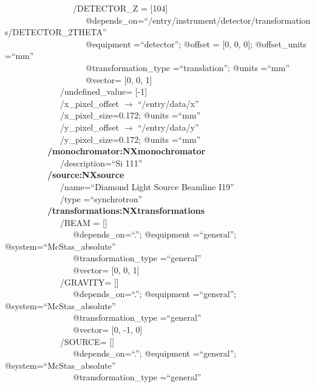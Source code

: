 \documentclass[11pt]{a0poster}
\begin{document}
\begin{minipage}[]{0.29\linewidth}
\-\ ~~~~~~~~~~~~~~~/DETECTOR\_Z = [104]\\
\-\ ~~~~~~~~~~~~~~~~~~@depends\_on=``/entry/instrument/detector/transformations/DETECTOR\_2THETA''\\
\-\ ~~~~~~~~~~~~~~~~~~@equipment =``detector''; @offset = [0, 0, 0]; @offset\_units =``mm''\\
\-\ ~~~~~~~~~~~~~~~~~~@transformation\_type =``translation''; @units =``mm''\\
\-\ ~~~~~~~~~~~~~~~~~~@vector= [0, 0, 1]\\
\-\ ~~~~~~~~~~~~/undefined\_value= [-1]\\
\-\ ~~~~~~~~~~~~/x\_pixel\_offset $\rightarrow$  ``/entry/data/x''\\
\-\ ~~~~~~~~~~~~/x\_pixel\_size=0.172; @units =``mm''\\
\-\ ~~~~~~~~~~~~/y\_pixel\_offset $\rightarrow$  ``/entry/data/y''\\
\-\ ~~~~~~~~~~~~/y\_pixel\_size=0.172; @units =``mm''\\
\-\ ~~~~~~~~~{\bf /monochromator:NXmonochromator}\\
\-\ ~~~~~~~~~~~~/description=``Si 111''\\
\-\ ~~~~~~~~~{\bf /source:NXsource}\\
\-\ ~~~~~~~~~~~~/name=``Diamond Light Source Beamline I19''\\
\-\ ~~~~~~~~~~~~/type =``synchrotron''\\
\-\ ~~~~~~~~~{\bf /transformations:NXtransformations}\\
\-\ ~~~~~~~~~~~~/BEAM = []\\
\-\ ~~~~~~~~~~~~~~~@depends\_on=``.''; @equipment =``general''; @system=``McStas\_absolute''\\
\-\ ~~~~~~~~~~~~~~~@transformation\_type =``general''\\
\-\ ~~~~~~~~~~~~~~~@vector= [0, 0, 1]\\
\-\ ~~~~~~~~~~~~/GRAVITY= []\\
\-\ ~~~~~~~~~~~~~~~@depends\_on=``.''; @equipment =``general''; @system=``McStas\_absolute''\\
\-\ ~~~~~~~~~~~~~~~@transformation\_type =``general''\\
\-\ ~~~~~~~~~~~~~~~@vector= [0, -1, 0]\\
\-\ ~~~~~~~~~~~~/SOURCE= []\\
\-\ ~~~~~~~~~~~~~~~@depends\_on=``.''; @equipment =``general''; @system=``McStas\_absolute''\\
\-\ ~~~~~~~~~~~~~~~@transformation\_type =``general''\\

\end{minipage}
\end{document}
